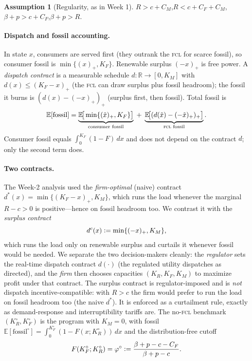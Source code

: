 \documentclass[11pt,reqno]{amsart}
\theoremstyle{plain}
\theoremstyle{definition}
\newtheorem{assumption}{Assumption}
\theoremstyle{remark}
\newcommand{\KR}{K_R}
\newcommand{\KF}{K_F}
\newcommand{\KM}{K_M}
\newcommand{\KRo}{K_R^{\circ}}
\newcommand{\KFo}{K_F^{\circ}}
\newcommand{\CM}{C_M}
\newcommand{\CF}{C_F}
\newcommand{\bp}{\beta+p}
\newcommand{\E}{\mathbb{E}}
\newcommand{\eqdef}{\vcentcolon=}
\newcommand{\fossil}{\mathrm{fossil}}
\begin{document}
\begin{assumption}[Regularity, as in Week 1]\label{ass:reg}
$R>c+\CM$,\quad $R<c+\CF+\CM$,\quad $\bp>c+\CF$,\quad $\bp>R$.
\end{assumption}

\paragraph{Dispatch and fossil accounting.} In state $x$, consumers are served first
(they outrank the \textsc{fcl} for scarce fossil), so consumer fossil is
$\min\{(x)_+,\KF\}$. Renewable surplus $(-x)_+$ is free power. A \emph{dispatch
contract} is a measurable schedule $d:\mathbb R\to[0,\KM]$ with
$d(x)\le(\KF-x)_+$ (the \textsc{fcl} can draw surplus plus fossil headroom); the
fossil it burns is $(d(x)-(-x)_+)_+$ (surplus first, then fossil). Total fossil is
\begin{equation}\label{eq:totfossil}
  \E[\fossil]=\underbrace{\E\!\big[\min\{(\tilde x)_+,\KF\}\big]}_{\text{consumer fossil}}
  \;+\;\underbrace{\E\!\big[(d(\tilde x)-(-\tilde x)_+)_+\big]}_{\text{\textsc{fcl} fossil}} .
\end{equation}
Consumer fossil equals $\int_0^{\KF}(1-F)\,dx$ and does not depend on the contract
$d$; only the second term does.

\paragraph{Two contracts.} The Week-2 analysis used the \emph{firm-optimal} (naive)
contract $d^{*}(x)=\min\{(\KF-x)_+,\KM\}$, which runs the load whenever the marginal
$R-c>0$ is positive---hence on fossil headroom too. We contrast it with the
\emph{surplus contract}
\begin{equation}\label{eq:surpcontract}
  d^{c}(x)\eqdef\min\{(-x)_+,\KM\} ,
\end{equation}
which runs the load only on renewable surplus and curtails it whenever fossil would be
needed. We separate the two decision-makers cleanly: the \emph{regulator} sets the
real-time dispatch contract $d(\cdot)$ (the regulated utility dispatches as directed),
and the \emph{firm} then chooses capacities $(\KR,\KF,\KM)$ to maximize profit under
that contract. The surplus contract is regulator-imposed and is \emph{not} dispatch
incentive-compatible: with $R>c$ the firm would prefer to run the load on fossil
headroom too (the naive $d^{*}$). It is enforced as a curtailment rule, exactly as
demand-response and interruptibility tariffs are. The no-\textsc{fcl} benchmark
$(\KRo,\KFo)$ is the program with $\KM=0$, with fossil
$\E[\fossil^{\circ}]=\int_0^{\KFo}(1-F(x;\KRo))\,dx$ and the distribution-free
cutoff
\begin{equation}\label{eq:phio}
  F(\KFo;\KRo)=\varphi^{\circ}\eqdef\frac{\bp-c-\CF}{\bp-c}.
\end{equation}
\end{document}
